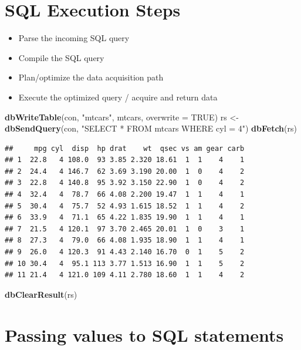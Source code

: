 \documentclass[]{book}
\newenvironment{Shaded}{\begin{snugshade}}{\end{snugshade}}
\newcommand{\DataTypeTok}[1]{\textcolor[rgb]{0.13,0.29,0.53}{#1}}
\newcommand{\KeywordTok}[1]{\textcolor[rgb]{0.13,0.29,0.53}{\textbf{#1}}}
\newcommand{\NormalTok}[1]{#1}
\newcommand{\OtherTok}[1]{\textcolor[rgb]{0.56,0.35,0.01}{#1}}
\newcommand{\StringTok}[1]{\textcolor[rgb]{0.31,0.60,0.02}{#1}}
\providecommand{\tightlist}{%
  \setlength{\itemsep}{0pt}\setlength{\parskip}{0pt}}
\theoremstyle{definition}
\theoremstyle{definition}
\theoremstyle{definition}
\theoremstyle{remark}
\begin{document}
\hypertarget{sql-execution-steps}{%
\section{SQL Execution Steps}\label{sql-execution-steps}}

\begin{itemize}
\tightlist
\item
  Parse the incoming SQL query
\item
  Compile the SQL query
\item
  Plan/optimize the data acquisition path
\item
  Execute the optimized query / acquire and return data
\end{itemize}

\begin{Shaded}
\begin{Highlighting}[]
\KeywordTok{dbWriteTable}\NormalTok{(con, }\StringTok{"mtcars"}\NormalTok{, mtcars, }\DataTypeTok{overwrite =} \OtherTok{TRUE}\NormalTok{)}
\NormalTok{rs <-}\StringTok{ }\KeywordTok{dbSendQuery}\NormalTok{(con, }\StringTok{"SELECT * FROM mtcars WHERE cyl = 4"}\NormalTok{)}
\KeywordTok{dbFetch}\NormalTok{(rs)}
\end{Highlighting}
\end{Shaded}

\begin{verbatim}
##     mpg cyl  disp  hp drat    wt  qsec vs am gear carb
## 1  22.8   4 108.0  93 3.85 2.320 18.61  1  1    4    1
## 2  24.4   4 146.7  62 3.69 3.190 20.00  1  0    4    2
## 3  22.8   4 140.8  95 3.92 3.150 22.90  1  0    4    2
## 4  32.4   4  78.7  66 4.08 2.200 19.47  1  1    4    1
## 5  30.4   4  75.7  52 4.93 1.615 18.52  1  1    4    2
## 6  33.9   4  71.1  65 4.22 1.835 19.90  1  1    4    1
## 7  21.5   4 120.1  97 3.70 2.465 20.01  1  0    3    1
## 8  27.3   4  79.0  66 4.08 1.935 18.90  1  1    4    1
## 9  26.0   4 120.3  91 4.43 2.140 16.70  0  1    5    2
## 10 30.4   4  95.1 113 3.77 1.513 16.90  1  1    5    2
## 11 21.4   4 121.0 109 4.11 2.780 18.60  1  1    4    2
\end{verbatim}

\begin{Shaded}
\begin{Highlighting}[]
\KeywordTok{dbClearResult}\NormalTok{(rs)}
\end{Highlighting}
\end{Shaded}

\hypertarget{passing-values-to-sql-statements}{%
\section{Passing values to SQL
statements}\label{passing-values-to-sql-statements}}
\end{document}
